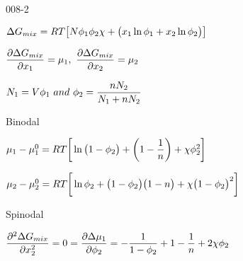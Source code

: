 \begin{mitframe}{008-2} %


\begin{listone}
    
    \item $\iipf\gibbs_{mix} = \gasconst\Temp\big[\nummoles\fhmolefrac{1}\fhmolefrac{2}\fhparam + \big(\specfrac{1}\ln\fhmolefrac{1} + \specfrac{2}\ln\fhmolefrac{2}\big)\big]$ 
    
    \item  $\dfrac{\partial\iipf\gibbs_{mix}}{\partial\specfrac{1}} = \chempot_{1} ,~\dfrac{\partial\iipf\gibbs_{mix}}{\partial\specfrac{2}} = \chempot_{2}$
    
    \item $\massspecflux{1} = \vol\fhmolefrac{1}~and~\fhmolefrac{2} = \dfrac{n\massspecflux{2}}{\massspecflux{1} + n\massspecflux{2}}$
    
    
    \item Binodal
    
    \begin{listtwo}
    
    	\item $\chempot_{1} - \chempot_{1}^{\init} = \gasconst\Temp\bigg[\ln\big(1-\fhmolefrac{2}\big)+\bigg(1-\dfrac{1}{n}\bigg)+\fhparam\fhmolefrac{2}^2\bigg]$
    
    	\item $\chempot_{2} - \chempot_{2}^{\init} = \gasconst\Temp\bigg[\ln\fhmolefrac{2}+\big(1-\fhmolefrac{2}\big)\big(1-n\big)+\fhparam\big(1-\fhmolefrac{2}\big)^2\bigg]$
    
    \end{listtwo}
        
    \item Spinodal
    
    \begin{listtwo}
    
    	\item $\dfrac{\partial^2\iipf\gibbs_{mix}}{\partial\specfrac{2}^2} = 0 = \dfrac{\partial\iipf\chempot_{1}}{\partial\fhmolefrac{2}} = -\dfrac{1}{1-\fhmolefrac{2}}+1-\dfrac{1}{n}+2\fhparam\fhmolefrac{2}$
    
    \end{listtwo}
    

\end{listone}
\end{mitframe}
